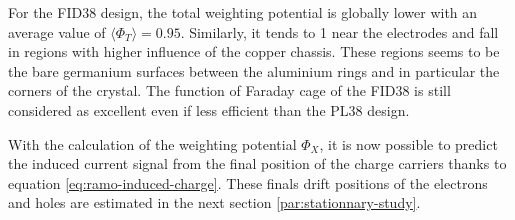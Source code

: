 For the FID38 design, the total weighting potential is globally lower with an average value of $\langle \Phi_T \rangle = 0.95$. Similarly, it tends to 1 near the electrodes and fall in regions with higher influence of the copper chassis. These regions seems to be the bare germanium surfaces between the aluminium rings and in particular the corners of the crystal. The function of Faraday cage of the FID38 is still considered as excellent even if less efficient than the PL38 design.




With the calculation of the weighting potential $\Phi_X$, it is now possible to predict the induced current signal from the final position of the charge carriers thanks to equation \ref{eq:ramo-induced-charge}. These finals drift positions of the electrons and holes are estimated in the next section \ref{par:stationnary-study}.



